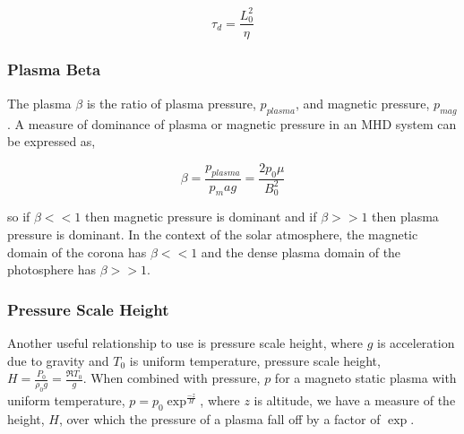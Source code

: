 \begin{equation}\label{difftime}
\tau_d = \frac{L_{0}^{2}}{\eta}
\end{equation}



%
\subsubsection{Plasma Beta}
The plasma $\beta$ is the ratio of plasma pressure, $p_{plasma}$, and magnetic pressure, $p_{mag}$. A measure of dominance of plasma or magnetic pressure in an MHD system can be expressed as, 

\begin{equation}\label{beta}
\beta=\frac{p_{plasma}}{p_mag} = \frac{2p_{0}\mu}{B_{0}^2}
\end{equation}

so if $\beta << 1$ then magnetic pressure is dominant and if $\beta >> 1$ then plasma pressure is dominant. In the context of the solar atmosphere, the magnetic domain of the corona has $\beta << 1$ and the dense plasma domain of the photosphere has $\beta >> 1$.

\subsubsection{Pressure Scale Height}
Another useful relationship to use is pressure scale height, where $g$ is acceleration due to gravity and $T_0$ is uniform temperature, pressure scale height, $H=\frac{P_0}{\rho_{0}g} = \frac{\Re T_{0}}{g}$. When combined with pressure, $p$ for a magneto static plasma with uniform temperature, $p=p_{0}\exp^{\frac{-z}{H}}$, where $z$ is altitude, we have a measure of the height, $H$, over which the pressure of a plasma fall off by a factor of $\exp$. 


